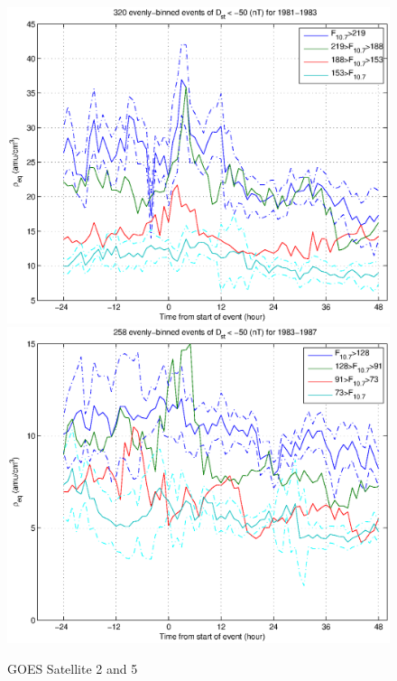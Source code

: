 \documentclass[10pt,twocolumn]{article}
\begin{document}
\begin{figure}[htp!]
\includegraphics[scale=0.45]{paperfigures/HighLowF107rhoeq-Dst50-sat2.eps}
\includegraphics[scale=0.45]{paperfigures/HighLowF107rhoeq-Dst50-sat5.eps}
\caption{GOES Satellite 2 and 5}
\end{figure}
\clearpage
\end{document}
